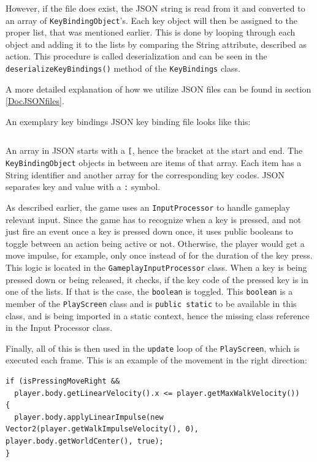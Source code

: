 \documentclass[12p]{article}
\begin{document}
However, if the file does exist, the JSON string is read from it and converted to an array of \texttt{KeyBindingObject}'s. Each key object will then be assigned to the proper list, that was mentioned earlier. This is done by looping through each object and adding it to the lists by comparing the String attribute, described as \texttt{}{action}. This procedure is called deserialization and can be seen in the \texttt{deserializeKeyBindings()} method of the \texttt{KeyBindings} class.

A more detailed explanation of how we utilize JSON files can be found in section \ref{DocJSONfiles}.

An exemplary key bindings JSON key binding file looks like this:
\inputminted[linenos,breaklines]{json}{code/json/keybindings.json}

An array in JSON starts with a \texttt{[}, hence the bracket at the start and end. The \texttt{KeyBindingObject} objects in between are items of that array. Each item has a String identifier and another array for the corresponding key codes. JSON separates key and value with a \texttt{:} symbol.

As described earlier, the game uses an \texttt{InputProcessor} to handle gameplay relevant input. Since the game has to recognize when a key is pressed, and not just fire an event once a key is pressed down once, it uses public booleans to toggle between an action being active or not. Otherwise, the player would get a move impulse, for example, only once instead of for the duration of the key press. This logic is located in the \texttt{GameplayInputProcessor} class. When a key is being pressed down or being released, it checks, if the key code of the pressed key is in one of the lists. If that is the case, the \texttt{boolean} is toggled. This \texttt{boolean} is a member of the \texttt{PlayScreen} class and is \texttt{public static} to be available in this class, and is being imported in a static context, hence the missing class reference in the Input Processor class.

Finally, all of this is then used in the \texttt{update} loop of the \texttt{PlayScreen}, which is executed each frame. This is an example of the movement in the right direction:

\begin{verbatim}
if (isPressingMoveRight &&
  player.body.getLinearVelocity().x <= player.getMaxWalkVelocity()) 
{
  player.body.applyLinearImpulse(new Vector2(player.getWalkImpulseVelocity(), 0), player.body.getWorldCenter(), true);
}
\end{verbatim}
\end{document}
